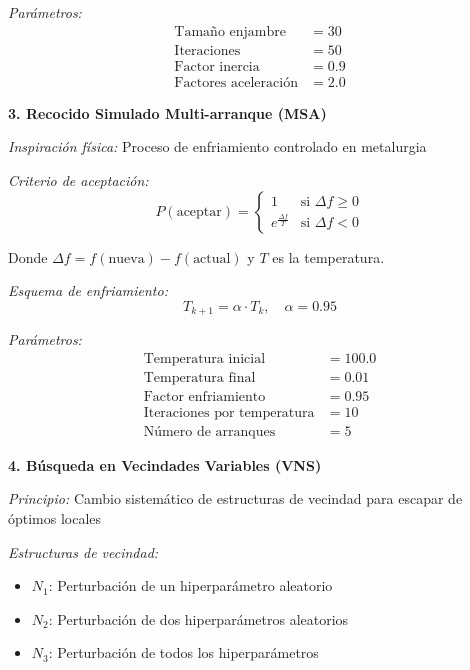 \textit{Parámetros:}
\begin{align}
\text{Tamaño enjambre} &= 30 \\
\text{Iteraciones} &= 50 \\
\text{Factor inercia} &= 0.9 \\
\text{Factores aceleración} &= 2.0
\end{align}

\textbf{3. Recocido Simulado Multi-arranque (MSA)}

\textit{Inspiración física:} Proceso de enfriamiento controlado en metalurgia

\textit{Criterio de aceptación:}
\begin{equation}
P(\text{aceptar}) = \begin{cases}
1 & \text{si } \Delta f \geq 0 \\
e^{\frac{\Delta f}{T}} & \text{si } \Delta f < 0
\end{cases}
\end{equation}

Donde $\Delta f = f(\text{nueva}) - f(\text{actual})$ y $T$ es la temperatura.

\textit{Esquema de enfriamiento:}
\begin{equation}
T_{k+1} = \alpha \cdot T_k, \quad \alpha = 0.95
\end{equation}

\textit{Parámetros:}
\begin{align}
\text{Temperatura inicial} &= 100.0 \\
\text{Temperatura final} &= 0.01 \\
\text{Factor enfriamiento} &= 0.95 \\
\text{Iteraciones por temperatura} &= 10 \\
\text{Número de arranques} &= 5
\end{align}

\textbf{4. Búsqueda en Vecindades Variables (VNS)}

\textit{Principio:} Cambio sistemático de estructuras de vecindad para escapar de óptimos locales

\textit{Estructuras de vecindad:}
\begin{itemize}
    \item $N_1$: Perturbación de un hiperparámetro aleatorio
    \item $N_2$: Perturbación de dos hiperparámetros aleatorios
    \item $N_3$: Perturbación de todos los hiperparámetros
\end{itemize}

